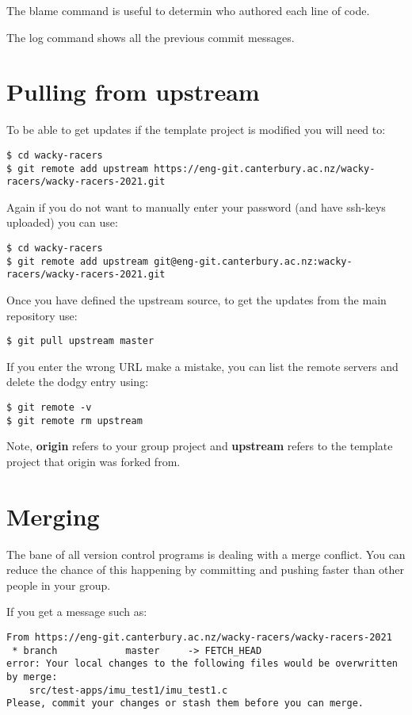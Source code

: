 The blame command is useful to determin who authored each line of code.

The log command shows all the previous commit messages.


\section{Pulling from upstream}
\label{git-pulling-from-upstream}

To be able to get updates if the template project is modified you will
need to:

\begin{verbatim}
$ cd wacky-racers 
$ git remote add upstream https://eng-git.canterbury.ac.nz/wacky-racers/wacky-racers-2021.git  
\end{verbatim}

Again if you do not want to manually enter your password (and have
ssh-keys uploaded) you can use:
%
\begin{verbatim}
$ cd wacky-racers 
$ git remote add upstream git@eng-git.canterbury.ac.nz:wacky-racers/wacky-racers-2021.git
\end{verbatim}

Once you have defined the upstream source, to get the updates from the
main repository use:
%
\begin{verbatim}
$ git pull upstream master
\end{verbatim}

If you enter the wrong URL make a mistake, you can list the remote
servers and delete the dodgy entry using:

\begin{verbatim}
$ git remote -v
$ git remote rm upstream
\end{verbatim}

Note, \textbf{origin} refers to your group project and \textbf{upstream}
refers to the template project that origin was forked from.

\section{Merging}
\label{git-merging}

The bane of all version control programs is dealing with a merge
conflict. You can reduce the chance of this happening by committing and
pushing faster than other people in your group.

If you get a message such as:

\begin{verbatim}
From https://eng-git.canterbury.ac.nz/wacky-racers/wacky-racers-2021
 * branch            master     -> FETCH_HEAD
error: Your local changes to the following files would be overwritten by merge:
    src/test-apps/imu_test1/imu_test1.c
Please, commit your changes or stash them before you can merge.
\end{verbatim}

